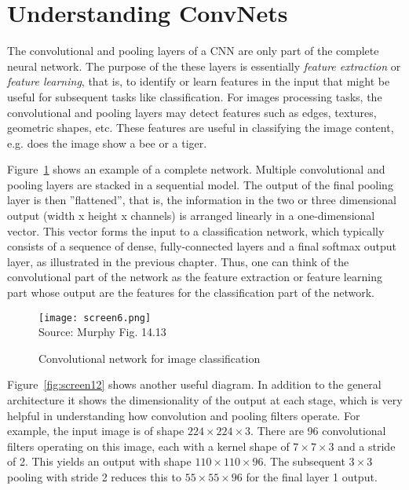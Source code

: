 \section{Understanding ConvNets}

The convolutional and pooling layers of a CNN are only part of the complete neural network. The purpose of the these layers is essentially \emph{feature extraction} or \emph{feature learning}, that is, to identify or learn features in the input that might be useful for subsequent tasks like classification. For images processing tasks, the convolutional and pooling layers may detect features such as edges, textures, geometric shapes, etc. These features are useful in classifying the image content, e.g. does the image show a bee or a tiger. 

Figure~\ref{fig:screen6} shows an example of a complete network. Multiple convolutional and pooling layers are stacked in a sequential model. The output of the final pooling layer is then ''flattened'', that is, the information in the two or three dimensional output (width x height x channels) is arranged linearly in a one-dimensional vector. This vector forms the input to a classification network, which typically consists of a sequence of dense, fully-connected layers and a final softmax output layer, as illustrated in the previous chapter. Thus, one can think of the convolutional part of the network as the feature extraction or feature learning part whose output are the features for the classification part of the network.

\begin{figure}
\centering
\texttt{[image: screen6.png]} \\

\scriptsize Source: Murphy Fig. 14.13
\caption{Convolutional network for image classification}
\label{fig:screen6}
\end{figure}

Figure~\ref{fig:screen12} shows another useful diagram. In addition to the general architecture it shows the dimensionality of the output at each stage, which is very helpful in understanding how convolution and pooling filters operate. For example, the input image is of shape $224 \times 224 \times 3$. There are 96 convolutional filters operating on this image, each with a kernel shape of $7 \times 7 \times 3$ and a stride of 2. This yields an output with shape $110 \times 110 \times 96$. The subsequent $3 \times 3$ pooling with stride 2 reduces this to $55 \times 55 \times 96$ for the final layer 1 output. 

